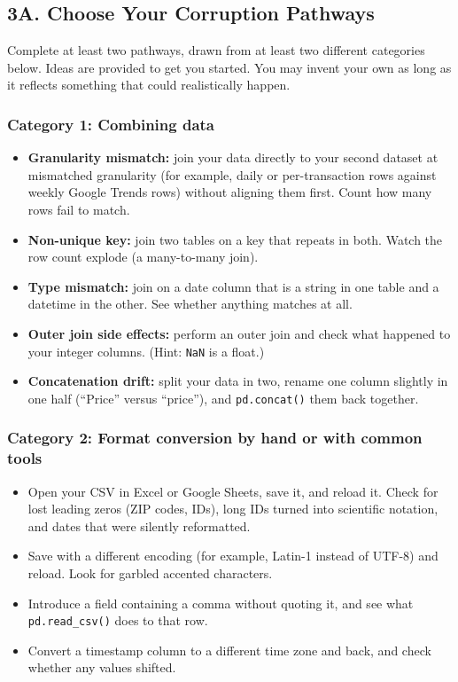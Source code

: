 \documentclass[11pt,letterpaper]{article}
\newcommand{\code}[1]{\texttt{#1}}
\begin{document}
\subsection{3A. Choose Your Corruption Pathways}

Complete at least two pathways, drawn from at least two different categories below. Ideas are provided to get you started. You may invent your own as long as it reflects something that could realistically happen.

\subsubsection{Category 1: Combining data}
\begin{itemize}
  \item \textbf{Granularity mismatch:} join your data directly to your second dataset at mismatched granularity (for example, daily or per-transaction rows against weekly Google Trends rows) without aligning them first. Count how many rows fail to match.
  \item \textbf{Non-unique key:} join two tables on a key that repeats in both. Watch the row count explode (a many-to-many join).
  \item \textbf{Type mismatch:} join on a date column that is a string in one table and a datetime in the other. See whether anything matches at all.
  \item \textbf{Outer join side effects:} perform an outer join and check what happened to your integer columns. (Hint: \code{NaN} is a float.)
  \item \textbf{Concatenation drift:} split your data in two, rename one column slightly in one half (``Price'' versus ``price''), and \code{pd.concat()} them back together.
\end{itemize}

\subsubsection{Category 2: Format conversion by hand or with common tools}
\begin{itemize}
  \item Open your CSV in Excel or Google Sheets, save it, and reload it. Check for lost leading zeros (ZIP codes, IDs), long IDs turned into scientific notation, and dates that were silently reformatted.
  \item Save with a different encoding (for example, Latin-1 instead of UTF-8) and reload. Look for garbled accented characters.
  \item Introduce a field containing a comma without quoting it, and see what \code{pd.read\_csv()} does to that row.
  \item Convert a timestamp column to a different time zone and back, and check whether any values shifted.
\end{itemize}
\end{document}
